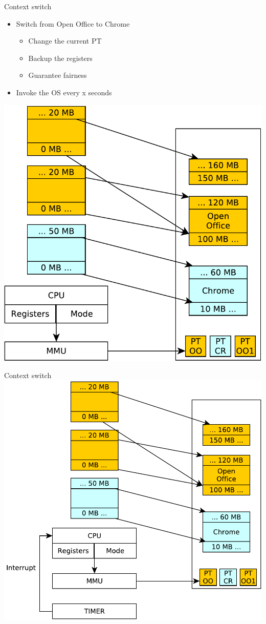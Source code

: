\documentclass{beamer}
\begin{document}
\begin{frame}{Context switch}
    \begin{itemize}
    \item Switch from Open Office to Chrome
    \begin{itemize}
    \item<2-> Change the current PT
    \item<3-> Backup the registers
    \item<4-> Guarantee fairness
    \end{itemize}
    \item<5-> Invoke the OS every x seconds
    \end{itemize}
    \includegraphics[width=0.3\linewidth]{process2}
\end{frame}

\begin{frame}{Context switch}
  \includegraphics[width=0.7\linewidth]{process3}
\end{frame}
\end{document}
